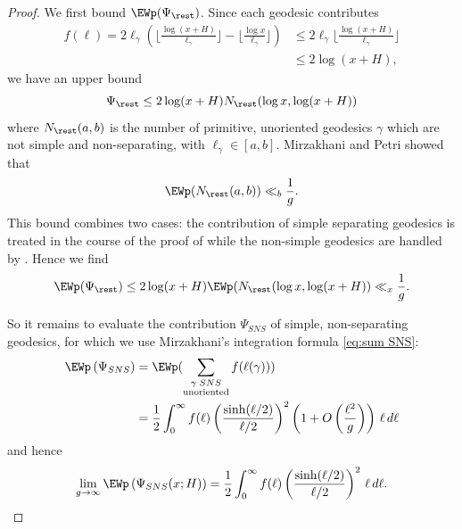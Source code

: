 \documentclass[12pt]{amsart}
\begin{document}
\begin{proof}
We first bound $\EWp(\Psi_{\rest})$. 
Since each geodesic contributes 
\[
\begin{split}
f(\ell) =2\ell_\gamma \left( \lfloor \frac{\log (x+H)}{\ell_\gamma} \rfloor -  \lfloor \frac{\log x}{\ell_\gamma} \rfloor  \right)
&
\leq 2\ell_\gamma   \lfloor \frac{\log (x+H)}{\ell_\gamma} \rfloor 
\\
&\leq 2\log (x+H), 
\end{split}
\] 
we have an upper bound
\[
\Psi_{\rest} \leq 2\log(x+H)   N_{\rest}(\log x, \log (x+H))
\]
where $N_{\rest}(a,b)$ is the number of primitive, unoriented geodesics $\gamma$ which are not simple and non-separating, with $\ell_\gamma\in [a,b]$.   
Mirzakhani and Petri \cite{MP} showed that %
\[
\EWp(N_{\rest}(a,b)) \ll_b \frac 1g.
\]
This bound combines two cases: the contribution of simple separating geodesics is treated in the course of the proof of \cite[Proposition 4.2]{MP} while the non-simple geodesics are handled by  \cite[Proposition 4.5]{MP}. 
Hence we find
\begin{equation}
\EWp(\Psi_{\rest} ) \leq 2\log(x+H)  \EWp(N_{\rest}(\log x, \log(x+H)) \ll_x \frac 1g. 
\end{equation}

So it remains to evaluate the contribution $\Psi_{SNS}$ of simple, non-separating geodesics, for which we   use Mirzakhani's integration formula \eqref{eq:sum SNS}: 
\[
\begin{split}
\EWp \left( \Psi_{SNS}  \right)  &= 
\EWp(\sum_{\substack{\gamma\; SNS\\ {\mathrm{unoriented}}}} f(\ell(\gamma)) )
\\ 
&=\frac 12    \int_0^\infty f(\ell) \left( \frac {\sinh(\ell/2)}{\ell/2} \right)^2 \left( 1+O \left(\frac { \ell^2}g \right) \right)\, \ell \,d\ell 
\end{split}
\]
and hence
\begin{equation}\label{expectation SNS}
\lim_{g\to \infty} \EWp \left( \Psi_{SNS}(x;H) \right)   
  = \frac 12    \int_0^\infty f(\ell) \left( \frac {\sinh(\ell/2)}{\ell/2} \right)^2 \, \ell \,d\ell  .
\end{equation}


\end{proof}
\end{document}
